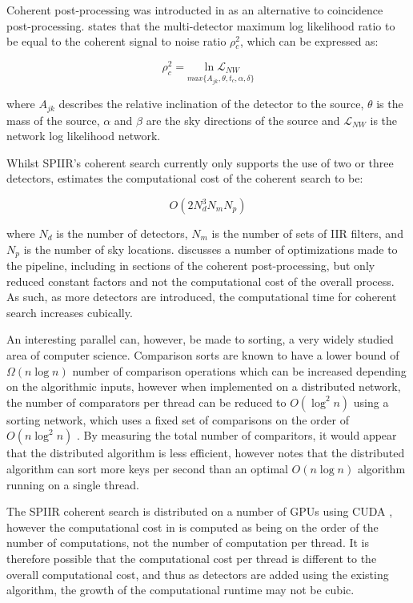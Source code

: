 \documentclass{article}
\begin{document}
Coherent post-processing was introducted in \cite{ChuThesis} as an alternative to coincidence
post-processing. \cite{ChuThesis} states that the multi-detector maximum log likelihood ratio to be
equal to the coherent signal to noise ratio \(\rho{}^2_c\), which can be expressed as:

\begin{equation}
    \rho^2_c = \underset{max\{A_{jk},\theta,t_{c},\alpha,\delta\}}{\ln \mathcal{L}_{NW}}
\end{equation}

where \(A_{jk}\) describes the relative inclination of the detector to the source, \(\theta\) is the
mass of the source, \(\alpha\) and \(\beta\) are the sky directions of the source and
\(\mathcal{L}_{NW}\) is the network log likelihood network.

Whilst SPIIR's coherent search currently only supports the use of two or three detectors,
\cite{ChuThesis} estimates the computational cost of the coherent search to be:

\begin{equation}
    O(2N^3_dN_mN_p)
\end{equation}

where \(N_d\) is the number of detectors, \(N_m\) is the number of sets of IIR filters, and \(N_p\)
is the number of sky locations. \cite{SPIIRGPU2018} discusses a number of optimizations made to the
pipeline, including in sections of the coherent post-processing, but only reduced constant factors
and not the computational cost of the overall process. As such, as more detectors are introduced,
the computational time for coherent search increases cubically.

An interesting parallel can, however, be made to sorting, a very widely studied area of computer
science. Comparison sorts are known to have a lower bound of \(\Omega{}(n\log{n})\) number of
comparison operations \cite{CLRS} which can be increased depending on the algorithmic inputs,
however when implemented on a distributed network, the number of comparators per thread can be
reduced to \(O(\log^2{n})\) using a sorting network, which uses a fixed set of comparisons on the
order of \(O(n\log^2{n})\) \cite{nvidia}. By measuring the total number of comparitors, it would
appear that the distributed algorithm is less efficient, however \cite{nvidia} notes that the
distributed algorithm can sort more keys per second than an optimal \(O(n\log{n})\) algorithm
running on a single thread.

The SPIIR coherent search is distributed on a number of GPUs using CUDA \cite{SPIIRGPU2018}, however
the computational cost in \cite{ChuThesis} is computed as being on the order of the number of
computations, not the number of computation per thread. It is therefore possible that the
computational cost per thread is different to the overall computational cost, and thus as detectors
are added using the existing algorithm, the growth of the computational runtime may not be cubic.
\end{document}
